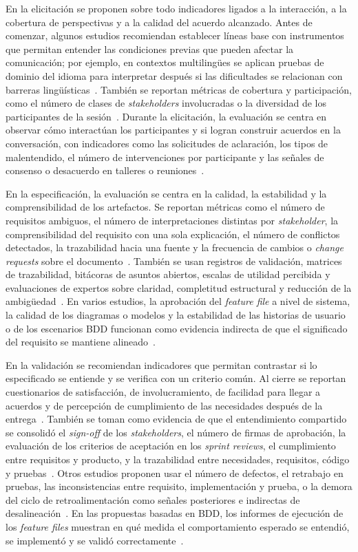 \documentclass[12pt,letterpaper,oneside]{report}
\begin{document}
En la elicitación se proponen sobre todo indicadores ligados a la interacción,
a la cobertura de perspectivas y a la calidad del acuerdo alcanzado. Antes de
comenzar, algunos estudios recomiendan establecer líneas base con instrumentos
que permitan entender las condiciones previas que pueden afectar la
comunicación; por ejemplo, en contextos multilingües se aplican pruebas de
dominio del idioma para interpretar después si las dificultades se relacionan
con barreras lingüísticas~\cite{calefato2015}. También se reportan métricas de
cobertura y participación, como el número de clases de \textit{stakeholders}
involucradas o la diversidad de los participantes de la sesión~\cite{pacheco2022}.
Durante la elicitación, la evaluación se centra en observar cómo interactúan los
participantes y si logran construir acuerdos en la conversación, con
indicadores como las solicitudes de aclaración, los tipos de malentendido, el
número de intervenciones por participante y las señales de consenso o
desacuerdo en talleres o reuniones~\cite{calefato2015}.

En la especificación, la evaluación se centra en la calidad, la estabilidad y la
comprensibilidad de los artefactos. Se reportan métricas como el número de
requisitos ambiguos, el número de interpretaciones distintas por
\textit{stakeholder}, la comprensibilidad del requisito con una sola
explicación, el número de conflictos detectados, la trazabilidad hacia una
fuente y la frecuencia de cambios o \textit{change requests} sobre el
documento~\cite{gentili2025}. También se usan registros de validación, matrices
de trazabilidad, bitácoras de asuntos abiertos, escalas de utilidad percibida y
evaluaciones de expertos sobre claridad, completitud estructural y reducción de
la ambigüedad~\cite{laporte2023}. En varios estudios, la aprobación del
\textit{feature file} a nivel de sistema, la calidad de los diagramas o modelos
y la estabilidad de las historias de usuario o de los escenarios BDD funcionan
como evidencia indirecta de que el significado del requisito se mantiene
alineado~\cite{irshad2021bdd}.

En la validación se recomiendan indicadores que permitan contrastar si lo
especificado se entiende y se verifica con un criterio común. Al cierre se
reportan cuestionarios de satisfacción, de involucramiento, de facilidad para
llegar a acuerdos y de percepción de cumplimiento de las necesidades después de
la entrega~\cite{calefato2015}. También se toman como evidencia de que el
entendimiento compartido se consolidó el \textit{sign-off} de los
\textit{stakeholders}, el número de firmas de aprobación, la evaluación de los
criterios de aceptación en los \textit{sprint reviews}, el cumplimiento entre
requisitos y producto, y la trazabilidad entre necesidades, requisitos, código y
pruebas~\cite{laporte2023}. Otros estudios proponen usar el número de defectos,
el retrabajo en pruebas, las inconsistencias entre requisito, implementación y
prueba, o la demora del ciclo de retroalimentación como señales posteriores e
indirectas de desalineación~\cite{gentili2025}. En las propuestas basadas en
BDD, los informes de ejecución de los \textit{feature files} muestran en qué
medida el comportamiento esperado se entendió, se implementó y se validó
correctamente~\cite{irshad2021bdd}.
\end{document}
